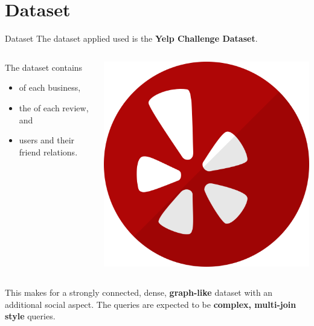 \section{Dataset}

\begin{frame}{Dataset}
    The dataset applied used is the \textbf{Yelp Challenge Dataset}.
    \vfill
    \begin{columns}
        \begin{column}{.6\textwidth}
        The dataset contains
            \begin{itemize}
                \item {} of each business,
                \item the  of each review, and
                \item users and their friend relations.
            \end{itemize}
            \end{column}%
            \hfill%
            \begin{column}{.39\textwidth}
            \centering
            \includegraphics[width=0.7\columnwidth]{img/yelp-logo.png}
        \end{column}%
    \end{columns}
    \vfill
    This makes for a strongly connected, dense, \textbf{graph-like} dataset with an additional social aspect. The queries are expected to be \textbf{complex, multi-join style} queries.
    \vfill
    \parnotes
\end{frame}

